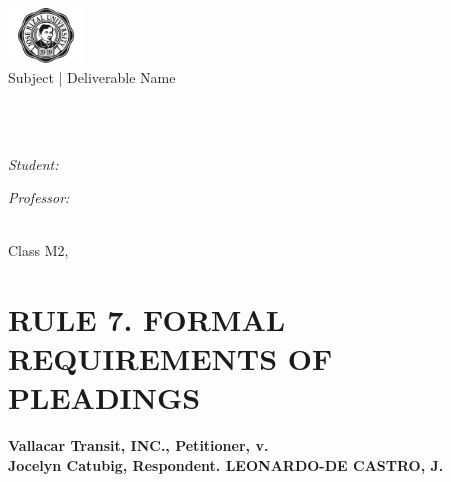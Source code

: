 \documentclass[
12pt,
oneside,
onehalfspacing,
headsepline
]{DigestCollection}
\author{Student Name}
\begin{document}
\frontmatter
\pagestyle{plain}
\begin{titlepage}
\begin{center}
\vspace*{.05\textheight}
{\LARGE \univname}\\[0.5cm]
\includegraphics[width=0.15\textwidth]{jrulogo.jpg}\\[0.5cm]
{\normalsize Subject | Deliverable Name}\\[0.5cm]
\HRule\\[0.4cm]{\huge \bfseries \ttitle\par}\vspace{0.4cm}\HRule\\[1.5cm]
\begin{minipage}[t]{0.4\textwidth}
\begin{flushleft}\emph{Student:}\\\authorname\end{flushleft}
\end{minipage}
\begin{minipage}[t]{0.4\textwidth}
\begin{flushright}\emph{Professor:}\\\supname\end{flushright}
\end{minipage}\\[3cm]
\vfill
Class M2,  \the\year{}
\vfill
\end{center}
\end{titlepage}
\cleardoublepage

\setlength{\cftchapnumwidth}{16mm} 
\setlength{\cftsecnumwidth}{16mm} 
\setlength{\cftsecindent}{0cm}
\renewcommand{\cftsecfont}{\small}
\tableofcontents
\cleardoublepage
\mainmatter


\pagestyle{thesis}

\chapter{RULE 7. FORMAL REQUIREMENTS OF PLEADINGS }


\noindent\textbf{Vallacar Transit, INC., Petitioner, v. \\Jocelyn Catubig, Respondent. LEONARDO-DE CASTRO, J.}\vspace{0.4cm}
\end{document}
